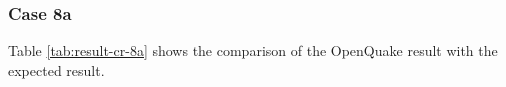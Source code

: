 \subsubsection{Case 8a}




Table \ref{tab:result-cr-8a} shows the comparison of the OpenQuake result with the expected result.

